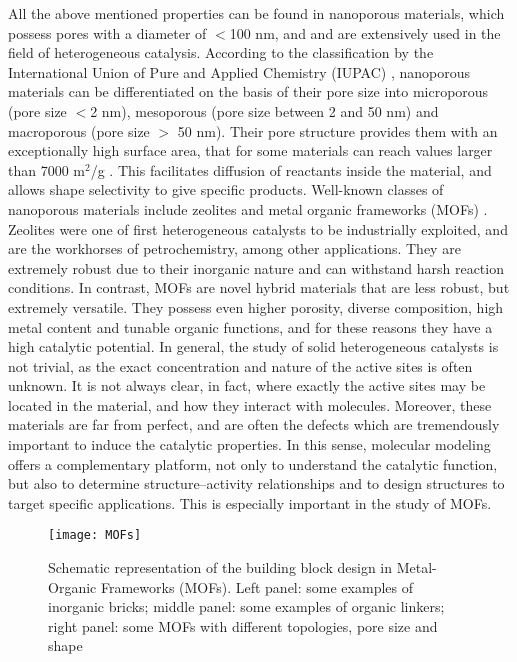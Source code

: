 \npar
All the above mentioned properties can be found in nanoporous materials, which possess pores with a diameter of $<$100 nm, and and are extensively used in the field of heterogeneous catalysis. According to the classification by the International Union of Pure and Applied Chemistry (IUPAC) \cite{mcnaught1997compendium}, nanoporous materials can be differentiated on the basis of their pore size into microporous (pore size $<$2 nm), mesoporous (pore size between 2 and 50 nm) and macroporous (pore size $>$ 50 nm). Their pore structure provides them with an exceptionally high surface area, that for some materials can reach values larger than 7000 m$^2$/g \cite{farha2012metal, honicke2018balancing}. This facilitates diffusion of reactants inside the material, and allows shape selectivity to give specific products. Well-known classes of nanoporous materials include zeolites and metal organic frameworks (MOFs) \cite{liang2017heterogeneous}. Zeolites were one of first heterogeneous catalysts to be industrially exploited, and are the workhorses of petrochemistry, among other applications. They are extremely robust due to their inorganic nature and can withstand harsh reaction conditions. In contrast, MOFs are novel hybrid materials that are less robust, but extremely versatile. They possess even higher porosity, diverse composition, high metal content and tunable organic functions, and for these reasons they have a high catalytic potential. 
\npar
In general, the study of solid heterogeneous catalysts is not trivial, as the exact concentration and nature of the active sites is often unknown. It is not always clear, in fact, where exactly the active sites may be located in the material, and how they interact with molecules. Moreover, these materials are far from perfect, and are often the defects which are tremendously important to induce the catalytic properties. In this sense, molecular modeling offers a complementary platform, not only to understand the catalytic function, but also to determine structure--activity relationships and to design structures to target specific applications\cite{van2015advances}. This is especially important in the study of MOFs.

\begin{figure}[!htbp]
	\centering
 	\texttt{[image: MOFs]}
	\caption{Schematic representation of the building block design in Metal-Organic Frameworks (MOFs). Left panel: some examples of inorganic bricks; middle panel: some examples of organic linkers; right panel: some MOFs with different topologies, pore size and shape}
	\label{fig:MOFs}
\end{figure}

